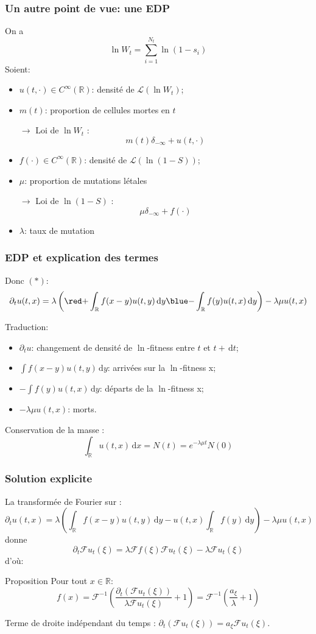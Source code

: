 \documentclass{beamer}
\newcommand{\prop}[1]{\begin{block}{Proposition}#1\end{block}}
\newcommand{\pth}[1]{\left(#1\right)}
\newcommand{\de}{\,\text{d}}
\newcommand{\Er}{\mathbb{R}}
\newcommand{\dr}{\partial}
\newcommand{\fr}{\mathcal{F}}
\begin{document}
\begin{frame}
  \frametitle{Un autre point de vue: une EDP}

  On a \[\ln W_t=\sum_{i=1}^{N_t}\ln(1-s_i)\]
  Soient:
\begin{itemize}[label=$\bullet$]
\item $u(t,\cdot)\in C^{\infty}(\Er)$: densité de $\mathcal{L}(\ln W_t)$;
\item $m(t)$: proportion de cellules mortes en $t$

$\to$ Loi de $\ln W_t$ :
\[\label{def_u} m(t)\delta_{-\infty}+u(t,\cdot)\]
\pause
\item $f(\cdot)\in C^{\infty}(\Er)$: densité de $\mathcal{L}(\ln(1-S))$;
\item $\mu$: proportion de mutations létales

$\to$ Loi de $\ln (1-S)$ :
\[\mu\delta_{-\infty}+f(\cdot)\]
\item $\lambda$: taux de mutation
\end{itemize}

\end{frame}
\begin{frame}
  \frametitle{EDP et explication des termes}

Donc $(*)$:
\[\dr_tu(t,x)=\lambda\pth{{\red +}\int_{\Er}f(x-y)u(t,y)\de y{\blue -}\int_{\Er}f(y)u(t,x)\de y}-\lambda\mu u(t,x)\]

\vspace{0.5cm}

Traduction:\pause
\begin{itemize}[label=$\bullet$]
\item $\dr_tu$: changement de densité de $\ln$-fitness entre $t$ et $t+\de t$;
\item $\int f(x-y)u(t,y)\de y$: arrivées sur la $\ln$-fitness x;
\item $-\int f(y)u(t,x)\de y$: départs de la $\ln$-fitness x;
\item $-\lambda\mu u(t,x)$: morts.
\end{itemize} 

\vspace{0.5cm}%

Conservation de la masse : $$\int_{\Er} u(t,x)\de x=N(t)=e^{-\lambda\mu t}N(0)$$

\end{frame}


\begin{frame}
  \frametitle{Solution explicite}
  La transformée de Fourier sur :
  \[\dr_tu(t,x)=\lambda\pth{\int_{\Er}f(x-y)u(t,y)\de y-u(t,x)\int_{\Er}f(y)\de y}-\lambda\mu u(t,x)\]
  donne
  \[\dr_t\fr u_t(\xi)=\lambda \fr f(\xi)\fr u_t(\xi)-\lambda\fr u_t(\xi)\]
  \pause
  d'où:
\prop{
    Pour tout $x\in\mathbb{R}$:
    \[f(x)=\fr^{-1}\pth{\frac{\dr_t\pth{\fr u_t(\xi)}}{\lambda\fr u_t(\xi)}+1}=\fr^{-1}\pth{\frac{a_{\xi}}{\lambda}+1}\]%
}

Terme de droite indépendant du temps : $\dr_t(\fr u_t(\xi))=a_{\xi}\fr u_t(\xi)$.

\end{frame}
\end{document}
